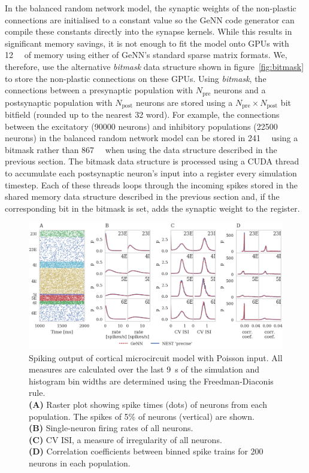 \documentclass[utf8]{frontiersSCNS} %
\begin{document}
In the balanced random network model, the synaptic weights of the non-plastic connections are initialised to a constant value so the GeNN code generator can compile these constants directly into the synapse kernels. 
While this results in significant memory savings, it is not enough to fit the model onto GPUs with \SI{12}{\giga\byte} of memory using either of GeNN's standard sparse matrix formats.
We, therefore, use the alternative \textit{bitmask} data structure shown in figure~\ref{fig:bitmask} to store the non-plastic connections on these GPUs.
Using \textit{bitmask}, the connections between a presynaptic population with $N_{\text{pre}}$ neurons and a postsynaptic population with $N_{\text{post}}$ neurons are stored using a $N_{\text{pre}} \times N_{\text{post}}$ bit bitfield (rounded up to the nearest \SI{32}{\bit} word).
For example, the connections between the excitatory (\num{90000} neurons) and inhibitory populations (\num{22500} neurons) in the balanced random network model can be stored in \SI{241}{\mebi\byte} using a bitmask rather than \SI{867}{\mebi\byte} when using the data structure described in the previous section.
The bitmask data structure is processed using a CUDA thread to accumulate each postsynaptic neuron's input into a register every simulation timestep.
Each of these threads loops through the incoming spikes stored in the shared memory data structure described in the previous section and, if the corresponding bit in the bitmask is set, adds the synaptic weight to the register.

\begin{figure}
    \begin{center}
        \includegraphics[width=180mm]{figures/microcircuit_accuracy}
    \end{center}
    \caption{Spiking output of cortical microcircuit model with Poisson input.
    All measures are calculated over the last \SI{9}{\second} of the simulation and histogram bin widths are determined using the Freedman-Diaconis rule.\\
    \textbf{(A)} Raster plot showing spike times (dots) of neurons from each population.
    The spikes of 5\% of neurons (vertical) are shown.\\
    \textbf{(B)} Single-neuron firing rates of all neurons.\\
    \textbf{(C)} CV ISI, a measure of irregularity of all neurons.\\
    \textbf{(D)} Correlation coefficients between binned spike trains for \num{200} neurons in each population.}
    \label{fig:microcircuit_accuracy}
\end{figure}
\end{document}
